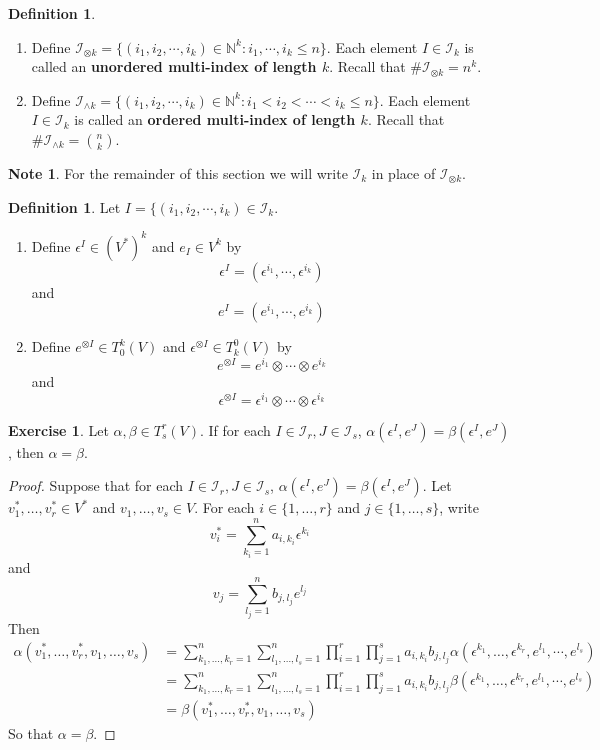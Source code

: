 \documentclass[12pt]{amsart}
\theoremstyle{definition}
\newtheorem{defn}[definition]{Definition}
\newtheorem{note}[definition]{Note}
\newtheorem{ex}[definition]{Exercise}
\newcommand{\al}{\alpha}
\newcommand{\bet}{\beta}
\newcommand{\ep}{\epsilon}
\newcommand{\N}{\mathbb{N}}
\newcommand{\MI}{\mathcal{I}}
\begin{document}
	
	\begin{defn}\
		\begin{enumerate}
		\item Define $\MI_{\otimes k} = \{(i_1, i_2, \cdots, i_k) \in \N^k: i_1,  \cdots,  i_k \leq n \}$. Each element $I \in \MI_{k}$ is called an \textbf{unordered multi-index of length $k$}. Recall that $\# \MI_{\otimes k} = n^k$. \\
		\item Define $\MI_{\wedge k} = \{(i_1, i_2, \cdots, i_k) \in \N^k: i_1 < i_2 < \cdots < i_k \leq n \}$. Each element $I \in \MI_{k}$ is called an \textbf{ordered multi-index of length $k$}. Recall that $\# \MI_{\wedge k} = {n \choose k}$. 
		\end{enumerate}
	\end{defn}
	
	\begin{note}
	For the remainder of this section we will write $\MI_k$ in place of $\MI_{\otimes k}$.
	\end{note}

	\begin{defn}
		Let $I = \{(i_1, i_2, \cdots, i_k) \in \MI_k$. \\ 
		\begin{enumerate}
		\item Define $\ep^I \in (V^*)^k$ and $e_I \in V^k$  by  $$\ep^I = (\ep^{i_1}, \cdots, \ep^{i_k})$$ 
		and 
		$$e^I = (e^{i_1}, \cdots, e^{i_k})$$ 
		\item Define $e^{\otimes I} \in T^k_0(V)$ and $\ep^{\otimes I} \in T^0_k(V)$ by 
		$$e^{\otimes I} = e^{i_1} \otimes \cdots \otimes e^{i_k}$$ 
		and 
		$$\ep^{\otimes I} = \ep^{i_1} \otimes \cdots \otimes \ep^{i_k}$$
		\end{enumerate}
	\end{defn}
	
	\begin{ex}
	Let $\al, \bet \in T^r_s(V)$. If for each $I \in \MI_r, J \in \MI_s$, $\al(\ep^I, e^J) = \bet(\ep^I, e^J)$, then $\al = \bet$.
	\end{ex}
	
	\begin{proof}
	Suppose that for each $I \in \MI_r, J \in \MI_s$, $\al(\ep^I, e^J) = \bet(\ep^I, e^J)$. Let $v^*_1, \dots, v^*_r \in V^*$ and $v_1, \dots, v_s \in V$. For each $i \in \{1, \dots, r\}$ and $j \in \{1, \dots, s\}$, write $$v^*_i = \sum\limits_{k_i = 1}^n a_{i, k_i} \ep^{k_i}$$ and $$v_j = \sum\limits_{l_j = 1}^n b_{j, l_j} e^{l_j}$$
	Then 
	\begin{align*}
	\al(v^*_1, \dots, v^*_r, v_1, \dots, v_s)
	&= \sum_{k_1, \dots, k_r =1}^n \sum_{l_1, \dots, l_s = 1}^n \prod_{i=1}^r \prod_{j=1}^s a_{i, k_i} b_{j, l_j} \al(\ep^{k_1}, \dots, \ep^{k_r}, e^{l_1}, \cdots, e^{l_s}) \\
	&= \sum_{k_1, \dots, k_r =1}^n \sum_{l_1, \dots, l_s = 1}^n \prod_{i=1}^r \prod_{j=1}^s a_{i, k_i} b_{j, l_j} \bet(\ep^{k_1}, \dots, \ep^{k_r}, e^{l_1}, \cdots, e^{l_s}) \\
	&= \bet(v^*_1, \dots, v^*_r, v_1, \dots, v_s)
	\end{align*}
	So that $\al = \bet$.
	\end{proof}
		
\end{document}
